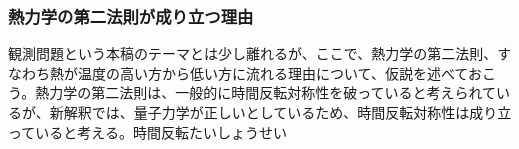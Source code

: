 \subsubsection{熱力学の第二法則が成り立つ理由}
観測問題という本稿のテーマとは少し離れるが、ここで、熱力学の第二法則、すなわち熱が温度の高い方から低い方に流れる理由について、仮説を述べておこう。熱力学の第二法則は、一般的に時間反転対称性を破っていると考えられているが、新解釈では、量子力学が正しいとしているため、時間反転対称性は成り立っていると考える。時間反転たいしょうせい
